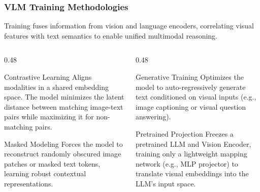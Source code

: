 \documentclass[10pt]{beamer}
\begin{document}
\begin{frame}[t]
    \frametitle{VLM Training Methodologies}
    \footnotesize
    Training fuses information from vision and language encoders, correlating visual features with text semantics to enable unified multimodal reasoning.

    \vspace{0.3cm}
    \begin{columns}[T]
        \begin{column}{0.48\textwidth}
            \begin{block}{Contrastive Learning}
                \scriptsize
                Aligns modalities in a shared embedding space. The model minimizes the latent distance between matching image-text pairs while maximizing it for non-matching pairs.
            \end{block}
            
            \vspace{0.1cm}
            \begin{block}{Masked Modeling}
                \scriptsize
                Forces the model to reconstruct randomly obscured image patches or masked text tokens, learning robust contextual representations.
            \end{block}
        \end{column}

        \begin{column}{0.48\textwidth}
            \begin{block}{Generative Training}
                \scriptsize
                Optimizes the model to auto-regressively generate text conditioned on visual inputs (e.g., image captioning or visual question answering).
            \end{block}

            \vspace{0.1cm}
            \begin{block}{Pretrained Projection}
                \scriptsize
                Freezes a pretrained LLM and Vision Encoder, training only a lightweight mapping network (e.g., MLP projector) to translate visual embeddings into the LLM's input space.
            \end{block}
        \end{column}
    \end{columns}
\end{frame}
\end{document}
